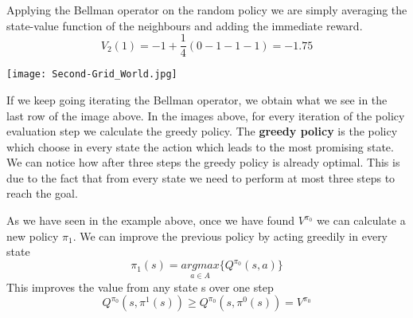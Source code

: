 \documentclass[main.tex]{subfiles}
\begin{document}
Applying the Bellman operator on the random policy we are simply averaging the state-value function of the neighbours and adding the immediate reward.
\begin{equation*}
    V_2(1) = -1 + \frac{1}{4}(0 -1 -1 -1) = -1.75
\end{equation*}
\begin{center}
    \texttt{[image: Second-Grid\_World.jpg]}
\end{center}
If we keep going iterating the Bellman operator, we obtain what we see in the last row of the image above. In the images above, for every iteration of the policy evaluation step we calculate the greedy policy. The \textbf{greedy policy} is the policy which choose in every state the action which leads to the most promising state. We can notice how after three steps the greedy policy is already optimal. This is due to the fact that from every state we need to perform at most three steps to reach the goal.
\newline
\par
\noindent
As we have seen in the example above, once we have found $V^{\pi_0}$ we can calculate a new policy $\pi_1$. We can improve the previous policy by acting greedily in every state
\begin{equation*}
    \pi_1(s) = \underset{a \in A}{argmax} \bigg\{ Q^{\pi_0}(s,a) \bigg\}
\end{equation*}
This improves the value from any state s over one step
\begin{equation*}
    Q^{\pi_0}(s, \pi^1(s)) \geq Q^{\pi_0}(s, \pi^0(s)) = V^{\pi_0}
\end{equation*}
\end{document}
